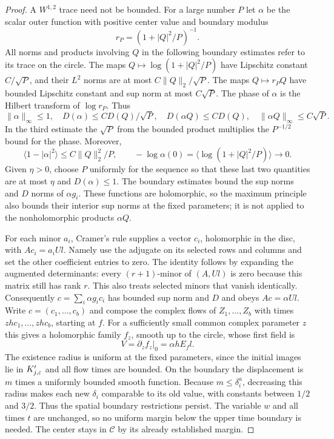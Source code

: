 \begin{proof}
A $W^{1,2}$ trace need not be bounded.  For a large number $P$ let
$\alpha$ be the scalar outer function with positive center value and
boundary modulus
\[
 r_P=(1+|Q|^2/P)^{-1}.
\]
All norms and products involving $Q$ in the following boundary estimates
refer to its trace on the circle.
The maps $Q\mapsto\log(1+|Q|^2/P)$ have Lipschitz constant
$C/\sqrt P$, and their $L^2$ norms are at most $C\|Q\|_2/\sqrt P$.
The maps $Q\mapsto r_PQ$ have bounded Lipschitz constant and sup norm
at most $C\sqrt P$.  The phase of $\alpha$ is the Hilbert transform of
$\log r_P$.  Thus
\[
 \|\alpha\|_\infty\le1,\quad
 D(\alpha)\le C D(Q)/\sqrt P,\quad
 D(\alpha Q)\le C D(Q),\quad
 \|\alpha Q\|_\infty\le C\sqrt P.
\]
In the third estimate the $\sqrt P$ from the bounded product multiplies
the $P^{-1/2}$ bound for the phase.  Moreover,
\[
 \langle1-|\alpha|^2\rangle\le C\|Q\|_2^2/P,
 \qquad -\log\alpha(0)=\langle\log(1+|Q|^2/P)\rangle\longrightarrow0.
\]
Given $\eta>0$, choose $P$ uniformly for the sequence so that these
last two quantities are at most $\eta$ and $D(\alpha)\le1$.
The boundary estimates bound the sup norms and $D$ norms of
$\alpha g_i$.  These functions are holomorphic, so the maximum principle
also bounds their interior sup norms at the fixed parameters; it is
not applied to the nonholomorphic products $\alpha Q$.

For each minor $a_i$, Cramer's rule supplies a vector $c_i$, holomorphic
in the disc, with $Ac_i=a_iUl$.  Namely use the adjugate on its selected
rows and columns and set the other coefficient entries to zero.
The identity follows by expanding the augmented determinants: every
$(r+1)$-minor of $(A,Ul)$ is zero because this matrix still has rank $r$.
This also treats selected minors that vanish identically.
Consequently $c=\sum_i\alpha g_i c_i$ has bounded sup norm and $D$ and
obeys $Ac=\alpha Ul$.  Write $c=(c_1,\ldots,c_b)$ and compose the
complex flows of $Z_1,\ldots,Z_b$
with times $z h c_1,\ldots,z h c_b$, starting at $f$.
For a sufficiently small common complex parameter $z$ this gives a
holomorphic family $f_z$, smooth up to the circle, whose first field is
\begin{equation}
 V=\left.\partial_z f_z\right|_0=\alpha hE_fl.
 \label{var:first-field}
\end{equation}
The existence radius is uniform at the fixed parameters, since the
initial images lie in $K_{j,\varepsilon}'$ and all flow times are bounded.
On the boundary the displacement is $m$ times a uniformly bounded
smooth function.  Because $m\le\delta_i^a$, decreasing this radius
makes each new $\delta_i$ comparable to its old value, with constants
between $1/2$ and $3/2$.  Thus the spatial boundary restrictions persist.
The variable $w$ and all times $t$ are unchanged, so no uniform margin
below the upper time boundary is needed.  The center stays in
$\mathcal C$ by its already established margin.


\end{proof}
